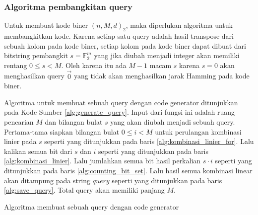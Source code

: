 \subsubsection{Algoritma pembangkitan query}

Untuk membuat kode biner $(n,M,d)_2$, maka diperlukan algoritma untuk membangkitkan kode. Karena setiap satu query adalah hasil transpose dari sebuah kolom pada kode biner, setiap kolom pada kode biner dapat dibuat dari bitstring pembangkit $s = \mathbb{F}_2^m$ yang jika diubah menjadi integer akan memiliki rentang $0 \leq s < M$. Oleh karena itu ada $M-1$ macam $s$ karena $s=0$ akan menghasilkan query $\vec{0}$ yang tidak akan menghasilkan jarak Hamming pada kode biner.

Algoritma untuk membuat sebuah query dengan code generator ditunjukkan pada Kode Sumber \ref{alg:generate_query}. Input dari fungsi ini adalah ruang pencarian $M$ dan bilangan bulat $s$ yang akan diubah menjadi sebuah query. Pertama-tama siapkan bilangan bulat $0 \leq i < M$ untuk perulangan kombinasi linier pada $s$ seperti yang ditunjukkan pada baris \ref{alg:kombinasi_linier_for}. Lalu kalikan semua bit dari $s$ dan $i$ seperti yang ditunjukkan pada baris \ref{alg:kombinasi_linier}. Lalu jumlahkan semua bit hasil perkalian $s \cdot i$ seperti yang ditunjukkan pada baris \ref{alg:counting_bit_set}. Lalu hasil semua kombinasi linear akan ditampung pada string $query$ seperti yang ditunjukkan pada baris \ref{alg:save_query}. Total query akan memiliki panjang $M$.

\begin{algorithm}[h]
\caption{Algoritma membuat sebuah query dengan code generator}
\label{alg:generate_query}
\end{algorithm}

